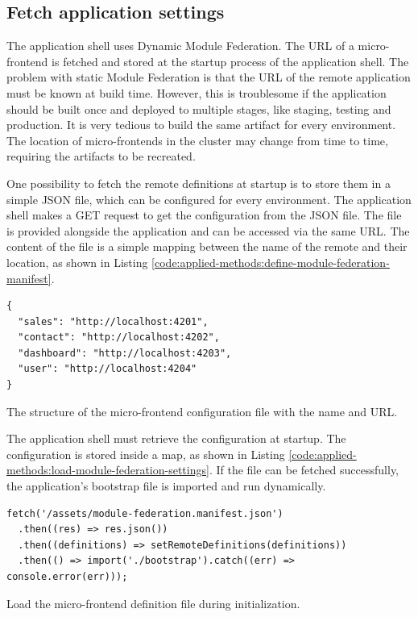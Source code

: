 \subsection{Fetch application settings}\label{subsection:applied-methods:prototypical-implementation
:load-remote-settings}

The application shell uses Dynamic Module Federation. The \ac{URL} of a micro-frontend is fetched and stored at the startup process of the application shell. The problem with static Module Federation is that the \ac{URL} of the remote application must be known at build time. However, this is troublesome if the application should be built once and deployed to multiple stages, like staging, testing and production. It is very tedious to build the same artifact for every environment. The location of micro-frontends in the cluster may change from time to time, requiring the artifacts to be recreated.

\bigskip

\noindent One possibility to fetch the remote definitions at startup is to store them in a simple \ac{JSON} file, which can be configured for every environment. The application shell makes a GET request to get the configuration from the \ac{JSON} file. The file is provided alongside the application and can be accessed via the same \ac{URL}. The content of the file is a simple mapping between the name of the remote and their location, as shown in Listing \ref{code:applied-methods:define-module-federation-manifest}.

\ifshowListings
\begin{listing}[H]
\begin{verbatim}
{
  "sales": "http://localhost:4201",
  "contact": "http://localhost:4202",
  "dashboard": "http://localhost:4203",
  "user": "http://localhost:4204"
}
\end{verbatim}
\caption{The structure of the micro-frontend configuration file with the name and \ac{URL}.}\label{code:applied-methods:define-module-federation-manifest}
\end{listing}
\fi

\noindent The application shell must retrieve the configuration at startup. The configuration is stored inside a map, as shown in Listing \ref{code:applied-methods:load-module-federation-settings}. If the file can be fetched successfully, the application's bootstrap file is imported and run dynamically.

\ifshowListings
\begin{listing}[H]
\begin{verbatim}
fetch('/assets/module-federation.manifest.json')
  .then((res) => res.json())
  .then((definitions) => setRemoteDefinitions(definitions))
  .then(() => import('./bootstrap').catch((err) => console.error(err)));
\end{verbatim}
\caption{Load the micro-frontend definition file during initialization.}\label{code:applied-methods:load-module-federation-settings}
\end{listing}
\fi

